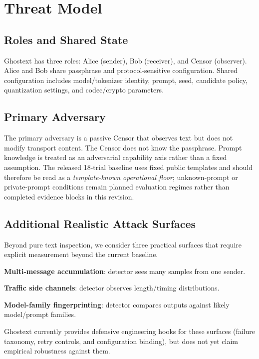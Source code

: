 \section{Threat Model}

\subsection{Roles and Shared State}

Ghostext has three roles: Alice (sender), Bob (receiver), and Censor (observer). Alice and Bob share passphrase and protocol-sensitive configuration. Shared configuration includes model/tokenizer identity, prompt, seed, candidate policy, quantization settings, and codec/crypto parameters.

\subsection{Primary Adversary}

The primary adversary is a passive Censor that observes text but does not modify transport content. The Censor does not know the passphrase. Prompt knowledge is treated as an adversarial capability axis rather than a fixed assumption. The released 18-trial baseline uses fixed public templates and should therefore be read as a \emph{template-known operational floor}; unknown-prompt or private-prompt conditions remain planned evaluation regimes rather than completed evidence blocks in this revision.

\subsection{Additional Realistic Attack Surfaces}

Beyond pure text inspection, we consider three practical surfaces that require explicit measurement beyond the current baseline.

\textbf{Multi-message accumulation}: detector sees many samples from one sender.

\textbf{Traffic side channels}: detector observes length/timing distributions.

\textbf{Model-family fingerprinting}: detector compares outputs against likely model/prompt families.

Ghostext currently provides defensive engineering hooks for these surfaces (failure taxonomy, retry controls, and configuration binding), but does not yet claim empirical robustness against them.

